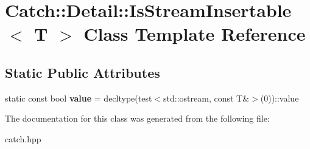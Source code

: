 \hypertarget{classCatch_1_1Detail_1_1IsStreamInsertable}{}\section{Catch\+::Detail\+::Is\+Stream\+Insertable$<$ T $>$ Class Template Reference}
\label{classCatch_1_1Detail_1_1IsStreamInsertable}
\subsection*{Static Public Attributes}
\begin{DoxyCompactItemize}
\item 
\mbox{\label{classCatch_1_1Detail_1_1IsStreamInsertable_a42818b09ae5851126a70ee263769e309}} 
static const bool {\bfseries value} = decltype(test$<$std\+::ostream, const T\&$>$(0))\+::value
\end{DoxyCompactItemize}


The documentation for this class was generated from the following file\+:\begin{DoxyCompactItemize}
\item 
catch.\+hpp\end{DoxyCompactItemize}
